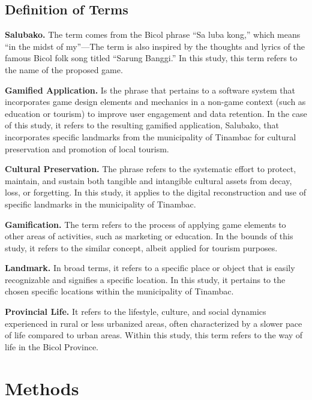 \documentclass{research}
\begin{document}
\section{Definition of Terms}

\textbf{Salubako.} The term comes from the Bicol phrase ``Sa luba kong,'' which means
``in the midst of my''---The term is also inspired by the thoughts and lyrics of the
famous Bicol folk song titled ``Sarung Banggi.'' In this study, this term refers to the
name of the proposed game.

\textbf{Gamified Application.} Is the phrase that pertains to a software system that
incorporates game design elements and mechanics in a non-game context (such as education
or tourism) to improve user engagement and data retention. In the case of this study,
it refers to the resulting gamified application, Salubako, that incorporates specific
landmarks from the municipality of Tinambac for cultural preservation and promotion of
local tourism.

\textbf{Cultural Preservation.} The phrase refers to the systematic effort to protect,
maintain, and sustain both tangible and intangible cultural assets from decay, loss, or
forgetting. In this study, it applies to the digital reconstruction and use of specific
landmarks in the municipality of Tinambac.

\textbf{Gamification.} The term refers to the process of applying game elements to
other areas of activities, such as marketing or education. In the bounds of this study,
it refers to the similar concept, albeit applied for tourism purposes.

\textbf{Landmark.} In broad terms, it refers to a specific place or object that is
easily recognizable and signifies a specific location. In this study, it pertains to the
chosen specific locations within the municipality of Tinambac.

\textbf{Provincial Life.} It refers to the lifestyle, culture, and social dynamics
experienced in rural or less urbanized areas, often characterized by a slower pace of
life compared to urban areas. Within this study, this term refers to the way of life in
the Bicol Province.

\clearpage

\chapter{Methods}
\end{document}
